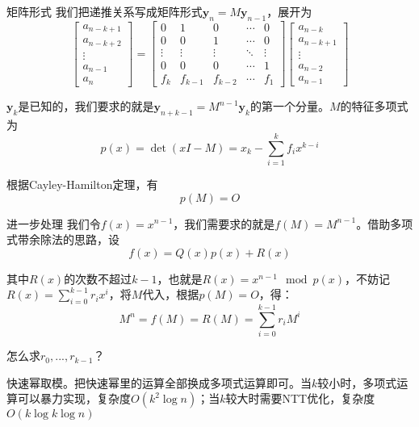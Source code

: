 \documentclass{beamer}
\begin{document}
\begin{frame}{矩阵形式}
    \small 
    我们把递推关系写成矩阵形式$\mathbf{y}_n=M\mathbf{y}_{n-1}$，展开为
    \begin{equation*}
        \begin{bmatrix}
            a_{n-k+1}\\
            a_{n-k+2}\\
            \vdots\\
            a_{n-1}\\
            a_{n}
        \end{bmatrix}=
        \begin{bmatrix}
            0 & 1 & 0 & \cdots & 0\\
            0 & 0 & 1 & \cdots & 0\\
            \vdots & \vdots & \vdots & \ddots & \vdots\\
            0 & 0 & 0 & \cdots & 1\\
            f_k & f_{k-1} & f_{k-2} & \cdots & f_1
        \end{bmatrix}
        \begin{bmatrix}
            a_{n-k}\\
            a_{n-k+1}\\
            \vdots\\
            a_{n-2}\\
            a_{n-1}
        \end{bmatrix}
    \end{equation*}

    $\mathbf{y}_k$是已知的，我们要求的就是$\mathbf{y}_{n+k-1}=M^{n-1}\mathbf{y}_k$的第一个分量。\pause $M$的特征多项式为
    \begin{equation*}
        p(x)=\det (xI-M) = x_k-\sum_{i=1}^k f_i x^{k-i}
    \end{equation*}

    \pause
    根据Cayley-Hamilton定理，有
    \begin{equation*}
        p(M)=O
    \end{equation*}
\end{frame}

\begin{frame}{进一步处理}
    \small 
    我们令$f(x)=x^{n-1}$，我们需要求的就是$f(M)=M^{n-1}$。\pause 借助多项式带余除法的思路，设
    \begin{equation*}
        f(x)=Q(x)p(x)+R(x)
    \end{equation*}
    
    其中$R(x)$的次数不超过$k-1$，也就是$R(x)=x^{n-1}\mod p(x)$，不妨记$R(x)=\sum_{i=0}^{k-1} r_i x^i$，\pause 将$M$代入，根据$p(M)=O$，得：
    \begin{equation*}
        M^n=f(M)=R(M)=\sum_{i=0}^{k-1} r_i M^i
    \end{equation*}

    怎么求$r_0,...,r_{k-1}$？

    \vspace{1em}
    \pause 快速幂取模。把快速幂里的运算全部换成多项式运算即可。当$k$较小时，多项式运算可以暴力实现，复杂度$O(k^2\log n)$；当$k$较大时需要NTT优化，复杂度$O(k\log k\log n)$
\end{frame}
\end{document}
